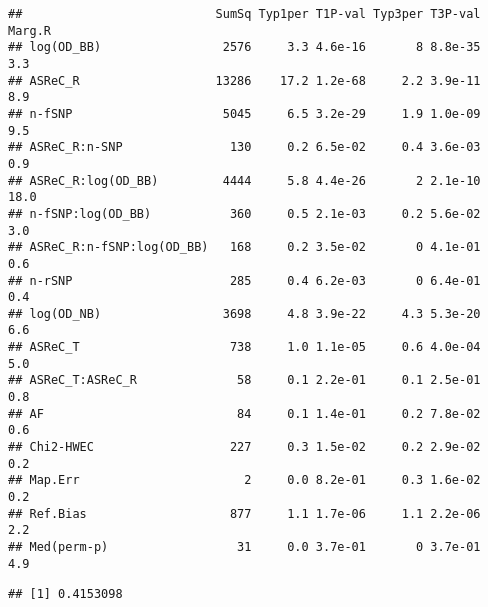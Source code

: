 \documentclass[]{article}
\newenvironment{Shaded}{\begin{snugshade}}{\end{snugshade}}
\newcommand{\KeywordTok}[1]{\textcolor[rgb]{0.13,0.29,0.53}{\textbf{#1}}}
\newcommand{\DataTypeTok}[1]{\textcolor[rgb]{0.13,0.29,0.53}{#1}}
\newcommand{\StringTok}[1]{\textcolor[rgb]{0.31,0.60,0.02}{#1}}
\newcommand{\OperatorTok}[1]{\textcolor[rgb]{0.81,0.36,0.00}{\textbf{#1}}}
\newcommand{\NormalTok}[1]{#1}
\begin{document}
\begin{Shaded}
\end{Shaded}

\begin{verbatim}
##                           SumSq Typ1per T1P-val Typ3per T3P-val Marg.R
## log(OD_BB)                 2576     3.3 4.6e-16       8 8.8e-35    3.3
## ASReC_R                   13286    17.2 1.2e-68     2.2 3.9e-11    8.9
## n-fSNP                     5045     6.5 3.2e-29     1.9 1.0e-09    9.5
## ASReC_R:n-SNP               130     0.2 6.5e-02     0.4 3.6e-03    0.9
## ASReC_R:log(OD_BB)         4444     5.8 4.4e-26       2 2.1e-10   18.0
## n-fSNP:log(OD_BB)           360     0.5 2.1e-03     0.2 5.6e-02    3.0
## ASReC_R:n-fSNP:log(OD_BB)   168     0.2 3.5e-02       0 4.1e-01    0.6
## n-rSNP                      285     0.4 6.2e-03       0 6.4e-01    0.4
## log(OD_NB)                 3698     4.8 3.9e-22     4.3 5.3e-20    6.6
## ASReC_T                     738     1.0 1.1e-05     0.6 4.0e-04    5.0
## ASReC_T:ASReC_R              58     0.1 2.2e-01     0.1 2.5e-01    0.8
## AF                           84     0.1 1.4e-01     0.2 7.8e-02    0.6
## Chi2-HWEC                   227     0.3 1.5e-02     0.2 2.9e-02    0.2
## Map.Err                       2     0.0 8.2e-01     0.3 1.6e-02    0.2
## Ref.Bias                    877     1.1 1.7e-06     1.1 2.2e-06    2.2
## Med(perm-p)                  31     0.0 3.7e-01       0 3.7e-01    4.9
\end{verbatim}

\begin{Shaded}
\end{Shaded}

\begin{verbatim}
## [1] 0.4153098
\end{verbatim}

\begin{Shaded}
\end{Shaded}
\end{document}
